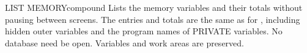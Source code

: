 \begin{XbaseEntry}{LIST MEMORY}{compound}
Lists the memory variables and their totals without pausing between screens.
\Syntax
{}
\Usage
The entries and totals are the same as for , including
hidden outer variables and the program names of PRIVATE variables.
No database need be open.  Variables and work areas are preserved.
\end{XbaseEntry}


